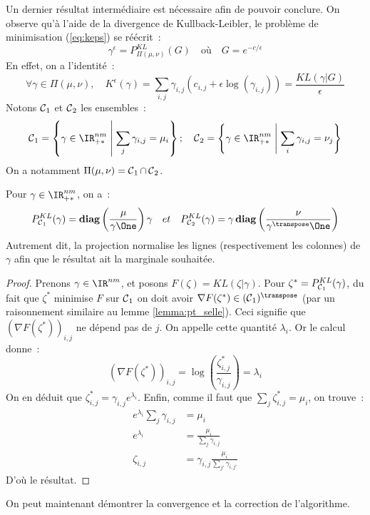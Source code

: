 Un dernier résultat intermédiaire est nécessaire afin de pouvoir conclure. On observe qu'à l'aide de la divergence de Kullback-Leibler, le problème de minimisation (\ref{eq:keps}) se réécrit~:
\[
\gamma^\epsilon = P^{KL}_{\Pi(\mu,\nu)} (G)
\quad \text{où} \quad G = e^{-c/\epsilon}
\]
En effet, on a l'identité~:
\[
\forall \gamma \in \Pi(\mu,\nu), 
\quad K^\epsilon(\gamma) 
= \sum_{i,j} \gamma_{i,j} (c_{i,j} + \epsilon \log(\gamma_{i,j}))
= \frac{KL(\gamma | G)}{\epsilon} 
\]
Notons $\operatorname{\mathcal{C}}_1$ et $\operatorname{\mathcal{C}}_2$ les ensembles~:
\[
\Ccal_1 = \left\{ \gamma \in \IR_{+*}^{nm} \;\middle|\; \sum_j \gamma_{i,j} = \mu_i \right\}
; \quad
\Ccal_2 = \left\{ \gamma \in \IR_{+*}^{nm} \;\middle|\; \sum_i \gamma_{i,j} = \nu_j \right\}
\]
On a notamment $\Pi(\mu,\nu) = \operatorname{\mathcal{C}}_1 \cap \operatorname{\mathcal{C}}_2$.
\begin{lemma}\label{lemma:pkl_c1c2}
Pour $\gamma \in \IR_{+*}^{nm}$, on a~:
\begin{equation}
P^{KL}_{\Ccal_1} (\gamma) = \diag \left(\frac{\mu}{\gamma \One} \right) \gamma
\quad et \quad
P^{KL}_{\Ccal_2} (\gamma) = \gamma \diag \left(\frac{\nu}{\gamma^\transpose \One} \right)
\end{equation}
Autrement dit, la projection normalise les lignes (respectivement les colonnes) de $\gamma$ afin que le résultat ait la marginale souhaitée.
\end{lemma}
\begin{proof}
Prenons $\gamma \in \IR^{nm}$, et posons $F(\zeta) = KL(\zeta | \gamma)$. Pour $\zeta^* = P^{KL}_{\operatorname{\mathcal{C}}_1} (\gamma)$, du fait que $\zeta^*$ minimise $F$ sur $\operatorname{\mathcal{C}}_1$ on doit avoir $\nabla F (\zeta^*) \in (\Ccal_1)^\transpose$ (par un raisonnement similaire au lemme \ref{lemma:pt_selle}). Ceci signifie que $(\nabla F (\zeta^*))_{i,j}$ ne dépend pas de $j$. On appelle cette quantité $\lambda_i$. Or le calcul donne~:
\[
\left(\nabla F (\zeta^*)\right) _{i,j} = \log \left(\frac{\zeta^*_{i,j}}{\gamma_{i,j}} \right) = \lambda_i
\]
On en déduit que $\zeta^*_{i,j} = \gamma_{i,j} e^{\lambda_i}$. Enfin, comme il faut que $\sum_{j} \zeta^*_{i,j} = \mu_i$, on trouve~:
\[\begin{split}
e^{\lambda_i} \sum_j \gamma_{i,j} &= \mu_i \\
e^{\lambda_i} &= \frac{\mu_i}{\sum_{j} \gamma_{i,j}} \\
\zeta_{i,j} &= \gamma_{i,j} \frac{\mu_i}{\sum_{j'} \gamma_{i,j'}}
\end{split}\]
D'où le résultat.
\end{proof}
On peut maintenant démontrer la convergence et la correction de l'algorithme.
